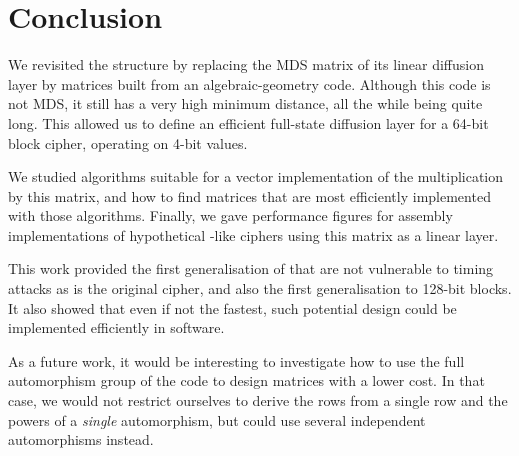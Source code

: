 \section{Conclusion}

We revisited the \shark{} structure by replacing the MDS matrix of its linear diffusion layer by matrices built from an algebraic-geometry code.
Although this code is not MDS, it still has a very high minimum distance, all the while being quite long.
This allowed us to define an efficient full-state diffusion layer for a 64-bit block cipher, operating on 4-bit values.

We studied algorithms suitable for a vector implementation of the multiplication by this matrix, and how to find matrices that are most efficiently implemented with
those algorithms.
Finally, we gave performance figures for assembly implementations of hypothetical \shark-like ciphers using this matrix as a linear layer.

This work provided the first generalisation of \shark{} that are not vulnerable to timing attacks as is the
original cipher, and also the first generalisation to 128-bit blocks. It also showed that even if not the fastest, such potential design could be implemented efficiently in software.

As a future work, it would be interesting to investigate how to use the full automorphism group of the code to design matrices with a lower cost. In that case, we would not restrict
ourselves to derive the rows from a single row and the powers of a \emph{single} automorphism, but could use several independent automorphisms instead. 
